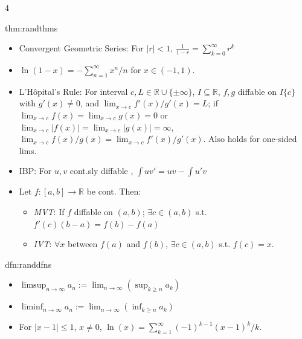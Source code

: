 \documentclass[landscape, 8pt]{extarticle}
\begin{document}
\begin{multicols*}{4}
		\begin{thm}{thm:randthms}{ }
		\begin{itemize}
			\item Convergent Geometric Series: For $\left|r\right| < 1$, $\frac{1}{1-r} = \sum_{k=0}^{\infty}r^k$
			\item $\ln(1-x) = - \sum_{n=1}^{\infty} x^n/n$ for $x\in (-1, 1)$.
			\item L'H\^opital's Rule: For interval $c, L\in \mathbb{R} \cup \{\pm \infty\}$, $I \subseteq \mathbb{R}$, $f, g$ diffable on $I\{c\}$ with $g'(x) \ne 0$, and $\lim_{x\to c} f'(x)/g'(x) = L$; if $\lim_{x\to c}f(x) = \lim_{x\to c} g(x) = 0$ or $\lim_{x\to c}\left|f(x)\right| = \lim_{x\to c} \left|g(x)\right| = \infty$, $\lim_{x\to c} f(x)/g(x) = \lim_{x\to c} f'(x)/g'(x)$. Also holds for one-sided lims.
			\item IBP: For $u, v$ cont.sly diffable , $\int uv' = uv - \int u'v$
			\item Let $f: [a, b] \to \mathbb{R}$ be cont. Then:
			\begin{itemize}
				\item \textit{MVT}: If $f$ diffable on $(a, b)$; $\exists c\in (a, b)$ s.t. $f'(c) (b-a) = f(b)-f(a)$
				\item \textit{IVT}: $\forall x$ between $f(a)$ and $f(b)$, $\exists c\in (a, b)$ s.t. $f(c) = x$.
			\end{itemize}
		\end{itemize}
		
		\end{thm}
		
		
		\begin{dfn}{dfn:randdfns}{ }
		\begin{itemize}
			\item $\limsup_{n\to \infty}a_n := \lim_{n\to \infty}(\sup_{k \ge n}a_k)$
			\item $\liminf_{n\to \infty}a_n := \lim_{n\to \infty}(\inf_{k \ge n}a_k)$
			\item For $\left|x-1\right| \le 1$, $x \ne 0$, $\ln(x) = \sum_{k=1}^{\infty} (-1)^{k-1}(x-1)^k/k$.
		\end{itemize}
		
		\end{dfn}
		

\end{multicols*}
\end{document}

